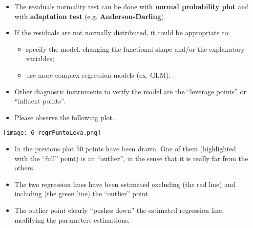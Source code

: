 \begin{frame}
  \vspace{.5cm}
  \begin{itemize}
    \item The residuals normality test can be done with \textbf{normal probability plot} and with \textbf{adaptation test} (e.g. \textbf{Anderson-Darling}).
    \vspace{.5cm}
    \item If the residuals are not normally distributed, it could be appropriate to:
    \begin{itemize}
      \item specify the model, changing the functional shape and/or the explanatory variables;
      \item use more complex regression models (ex. GLM).
    \end{itemize}
  \end{itemize}
\end{frame}


\begin{frame}
 \begin{itemize}
    \item Other diagnostic instruments to verify the model are the ``leverage points'' or ``influent points''.
    \item Please observe the following plot.
  \end{itemize}
  \begin{center}
    \texttt{[image: 6\_regrPuntoLeva.png]}
  \end{center}
\end{frame}

\begin{frame}
\vspace{0.5cm}
  \begin{itemize}
    \item In the previous plot 50 points have been drawn. One of them (highlighted with the ``full'' point) is an ``outlier'', in the sense that it is really far from the others.
    \vspace{0.5cm}
    \item The two regression lines have been estimated excluding (the red line) and including (the green line) the ``outlier'' point.
    \vspace{0.5cm}
    \item The outlier point clearly ``pushes down'' the estimated regression line, modifying the parameters estimations.
  \end{itemize}
\end{frame}

